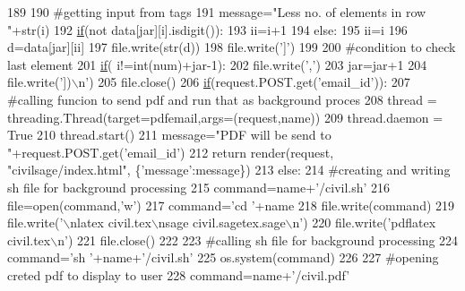 \begin{DoxyCode}
189 
190                 \textcolor{comment}{#getting input from tags}
191                 message=\textcolor{stringliteral}{"Less no. of elements in row "}+str(i)
192                 \hyperlink{bootstrap_8min_8js_ac2d69f5011896c6ed4a54e0dd36f6334}{if}(\textcolor{keywordflow}{not} data[jar][i].isdigit()):
193                     ii=i+1
194                 \textcolor{keywordflow}{else}:
195                     ii=i
196                 d=data[jar][ii]
197                 file.write(str(d))
198                 file.write(\textcolor{stringliteral}{']'})
199 
200                 \textcolor{comment}{#condition to check last element}
201                 \hyperlink{bootstrap_8min_8js_ac2d69f5011896c6ed4a54e0dd36f6334}{if}( i!=int(num)+jar-1):
202                     file.write(\textcolor{stringliteral}{','})
203             jar=jar+1
204             file.write(\textcolor{stringliteral}{'])\(\backslash\)n'})
205         file.close()
206         \hyperlink{bootstrap_8min_8js_ac2d69f5011896c6ed4a54e0dd36f6334}{if}(request.POST.get(\textcolor{stringliteral}{'email\_id'})):
207             \textcolor{comment}{#calling funcion to send pdf and run that as background proces}
208             thread = threading.Thread(target=pdfemail,args=(request,name))
209             thread.daemon = \textcolor{keyword}{True}
210             thread.start()
211             message=\textcolor{stringliteral}{"PDF will be send to "}+request.POST.get(\textcolor{stringliteral}{'email\_id'})
212             \textcolor{keywordflow}{return} render(request, \textcolor{stringliteral}{"civilsage/index.html"}, \{\textcolor{stringliteral}{'message'}:message\})
213         \textcolor{keywordflow}{else}:
214             \textcolor{comment}{#creating and writing sh file for background processing}
215             command=name+\textcolor{stringliteral}{'/civil.sh'}
216             file=open(command,\textcolor{stringliteral}{'w'})
217             command=\textcolor{stringliteral}{'cd '}+name
218             file.write(command)
219             file.write(\textcolor{stringliteral}{'\(\backslash\)nlatex civil.tex\(\backslash\)nsage civil.sagetex.sage\(\backslash\)n'})
220             file.write(\textcolor{stringliteral}{'pdflatex civil.tex\(\backslash\)n'})
221             file.close()
222 
223             \textcolor{comment}{#calling sh file for background processing}
224             command=\textcolor{stringliteral}{'sh '}+name+\textcolor{stringliteral}{'/civil.sh'}
225             os.system(command)
226 
227             \textcolor{comment}{#opening creted pdf to display to user}
228             command=name+\textcolor{stringliteral}{'/civil.pdf'}

\end{DoxyCode}
